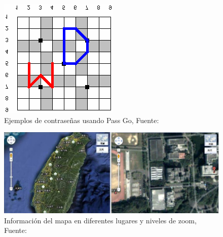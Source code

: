 \begin{anexos}
\begin{figure}[H]
\begin{minipage}{0.5\linewidth}
	\end{minipage} %
	\hfill
	\begin{minipage}{0.5\linewidth}  %
		\centering
		\includegraphics[width=\linewidth]{passgo3.png} %
	\end{minipage} %
	\caption{Ejemplos de contraseñas usando Pass Go, Fuente: \cite{tao2008pass}}
	\label{go-passwords}
\end{figure} 

\begin{figure}[H]
	\centering
	\includegraphics[width=0.5\linewidth]{pass maps2.jpg}
	\caption{Información del mapa en diferentes lugares y niveles de zoom, Fuente: \cite{10.1145/2414456.2414513}}
	\label{passmap}
\end{figure}


\end{anexos}
